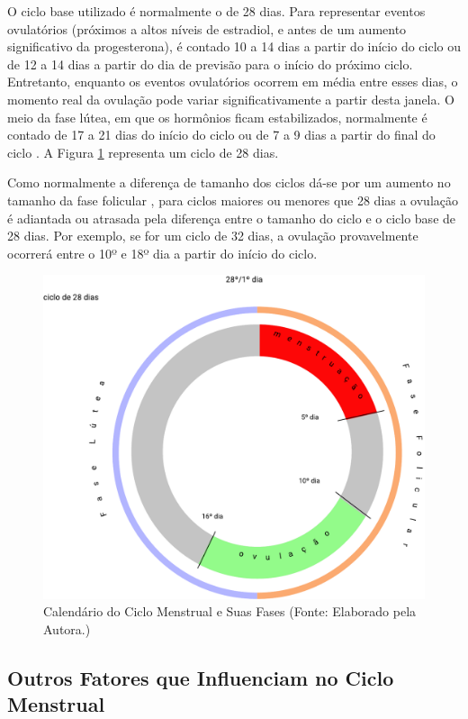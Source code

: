 O ciclo base utilizado é normalmente o de 28 dias. Para representar eventos
ovulatórios (próximos a altos níveis de estradiol, e antes de um aumento significativo da
progesterona), é contado 10 a 14 dias a partir do início do ciclo ou de 12 a 14 dias a partir do
dia de previsão para o início do próximo ciclo. Entretanto, enquanto os eventos ovulatórios ocorrem
em média entre esses dias, o momento real da ovulação pode variar significativamente
a partir desta janela. O meio da fase lútea, em que os hormônios ficam 
estabilizados, normalmente é contado de 17 a 21 dias do início do ciclo 
ou de 7 a 9 dias a partir do final do ciclo \cite{wideman2013}. 
A Figura \ref{fig02} representa um ciclo de 28 dias.

Como normalmente a diferença de tamanho dos ciclos dá-se por um aumento 
no tamanho da fase folicular \cite{lenton1984a}, para ciclos maiores ou 
menores que 28 dias a ovulação é adiantada ou atrasada pela diferença 
entre o tamanho do ciclo e o ciclo base de 28 dias. Por exemplo, se for 
um ciclo de 32 dias, a ovulação provavelmente ocorrerá entre o 10º e 18º dia 
a partir do início do ciclo.

\begin{figure}[h]
	\centering
	\includegraphics[keepaspectratio=true,scale=0.4]{figuras/Group1.pdf}
	\caption{Calendário do Ciclo Menstrual e Suas Fases (Fonte: Elaborado pela Autora.)}
        \label{fig02}
\end{figure}

\subsection{Outros Fatores que Influenciam no Ciclo Menstrual}

